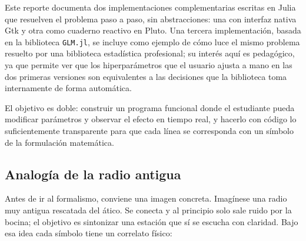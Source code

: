 \documentclass[11pt,a4paper]{article}
\begin{document}
Este reporte documenta dos implementaciones complementarias escritas en Julia que resuelven el problema paso a paso, sin abstracciones: una con interfaz nativa Gtk y otra como cuaderno reactivo en Pluto. Una tercera implementaci\'on, basada en la biblioteca \texttt{GLM.jl}, se incluye como ejemplo de c\'omo luce el mismo problema resuelto por una biblioteca estad\'istica profesional; su inter\'es aqu\'i es pedag\'ogico, ya que permite ver que los hiperpar\'ametros que el usuario ajusta a mano en las dos primeras versiones son equivalentes a las decisiones que la biblioteca toma internamente de forma autom\'atica.

El objetivo es doble: construir un programa funcional donde el estudiante pueda modificar par\'ametros y observar el efecto en tiempo real, y hacerlo con c\'odigo lo suficientemente transparente para que cada l\'inea se corresponda con un s\'imbolo de la formulaci\'on matem\'atica.

\subsection{Analog\'ia de la radio antigua}

Antes de ir al formalismo, conviene una imagen concreta. Imag\'inese una radio muy antigua rescatada del \'atico. Se conecta y al principio solo sale ruido por la bocina; el objetivo es sintonizar una estaci\'on que s\'i se escucha con claridad. Bajo esa idea cada s\'imbolo tiene un correlato f\'isico:
\end{document}
